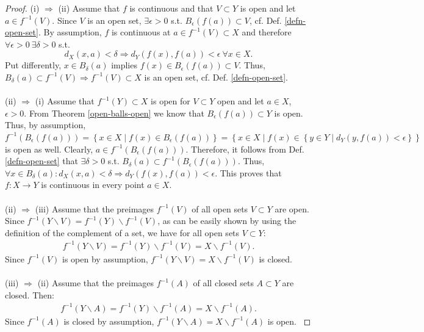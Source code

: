 \begin{proof}
	(i) $\Rightarrow$ (ii) Assume that $f$ is continuous and that $V\subset Y$ is open and let $a\in f^{-1}\left( V\right)$. Since $V$ is an open set, $\exists \epsilon > 0$ s.t. $B_{\epsilon}\left( f\left(a\right) \right)\subset V$, cf. Def. \ref{defn-open-set}. By assumption, $f$ is continuous at $a\in f^{-1}\left(V\right)\subset X$ and therefore $\forall \epsilon > 0 \ \exists \delta > 0$ s.t. 
	$$d_{X}\left(x, a\right) < \delta\Rightarrow d_{Y}\left(f\left(x\right), f\left(a\right)\right) < \epsilon \ \forall x\in X.$$ 
	Put differently, $x\in B_{\delta}\left( a\right)$ implies $f\left(x\right) \in B_{\epsilon}\left( f\left(a\right) \right) \subset V$. Thus, $B_{\delta}(a) \subset f^{-1}(V) \Rightarrow f^{-1}(V) \subset X$ is an open set, cf. Def. \ref{defn-open-set}. 
	\\ 
	\\ 
	(ii) $\Rightarrow$ (i) Assume that $f^{-1}\left(Y\right) \subset X$ is open for $V\subset Y$ open and let $a\in X$, $\epsilon > 0$. From Theorem \ref{open-balls-open} we know that $B_{\epsilon}\left(f\left(a\right)\right)\subset Y$ is open. Thus, by assumption, $f^{-1}\left( B_{\epsilon}\left( f\left(a\right) \right) \right) = \left\{ x\in X \mid f\left( x \right) \in B_{\epsilon}\left( f\left(a\right) \right) \right\} = \left\{ x\in X \mid f\left(x\right) \in \left\{ y\in Y\mid d_Y\left( y, f\left(a\right) \right) < \epsilon \right\}\right\}$ is open as well. Clearly, $a\in f^{-1}\left( B_{\epsilon}\left( f\left(a\right) \right) \right)$. Therefore, it follows from Def. \ref{defn-open-set} that $\exists\delta > 0$ s.t. $B_{\delta}(a) \subset f^{-1}\left( B_{\epsilon}\left( f\left(a\right) \right) \right)$. Thus, $\forall x\in B_{\delta}(a): d_{X}\left( x, a \right) < \delta \Rightarrow d_Y\left(f\left(x\right), f\left(a\right)\right) < \epsilon$. This proves that $f: X\rightarrow Y$ is continuous in every point $a\in X$. \cite{cont-functions-open-sets}   
	\\ 
	\\
	(ii) $\Rightarrow$ (iii) Assume that the preimages $f^{-1}(V)$ of all open sets $V\subset Y$ are open. Since $f^{-1}(Y\backslash V) = f^{-1}(Y)\backslash f^{-1}(V)$, as can be easily shown by using the definition of the complement of a set, we have for all open sets $V \subset Y$: 
	\begin{align}
		f^{-1}(Y\backslash V) = f^{-1}(Y)\backslash f^{-1}(V) = X\backslash f^{-1}(V). 
	\end{align}
	Since $f^{-1}(V)$ is open by assumption, $f^{-1}(Y\backslash V) = X\backslash f^{-1}(V)$ is closed. 
	\\ 
	\\
	(iii) $\Rightarrow$ (ii) Assume that the preimages $f^{-1}(A)$
	of all closed sets $A\subset Y$ are closed. Then: 
	\begin{align}
		f^{-1}(Y\backslash A) = f^{-1}(Y)\backslash f^{-1}(A) = X\backslash f^{-1}(A). 
	\end{align}
	Since $f^{-1}(A)$ is closed by assumption, $f^{-1}(Y\backslash A) = X\backslash f^{-1}(A)$ is open. \cite{preimage-of-closed-sets}
\end{proof} 

